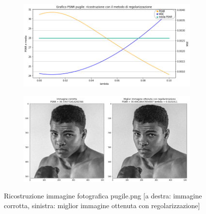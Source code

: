 \begin{figure}[H]
    \centering
    \begin{subfigure}{0.5\textwidth}
        \includegraphics[width=\textwidth]{imgRicostruzione/graficoPugile_minimize.png}
    \end{subfigure}%
    \begin{subfigure}{0.5\textwidth}
        \centering
        \includegraphics[width=\textwidth]{imgRicostruzione/ricostruzionePugile_minimize.png}
    \end{subfigure}
    \caption{Ricostruzione immagine fotografica pugile.png [a destra: immagine corrotta, sinistra: miglior immagine ottenuta con regolarizzazione]}
\end{figure}